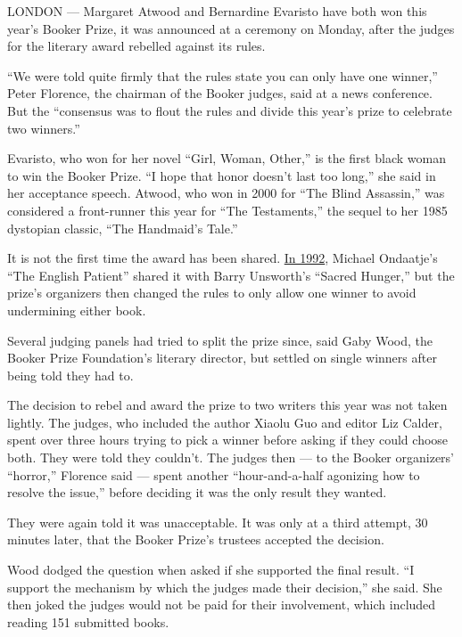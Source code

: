 LONDON --- Margaret Atwood and Bernardine Evaristo have both won this
year's Booker Prize, it was announced at a ceremony on Monday, after the
judges for the literary award rebelled against its rules.

``We were told quite firmly that the rules state you can only have one
winner,'' Peter Florence, the chairman of the Booker judges, said at a
news conference. But the ``consensus was to flout the rules and divide
this year's prize to celebrate two winners.''

Evaristo, who won for her novel ``Girl, Woman, Other,'' is the first
black woman to win the Booker Prize. ``I hope that honor doesn't last
too long,'' she said in her acceptance speech. Atwood, who won in 2000
for ``The Blind Assassin,'' was considered a front-runner this year for
``The Testaments,'' the sequel to her 1985 dystopian classic, ``The
Handmaid's Tale.''

It is not the first time the award has been shared.
\href{https://www.nytimes.com/1992/10/14/books/book-notes-a-lost-work-by-joyce-fuels-scholarly-debate.html}{In
1992}, Michael Ondaatje's ``The English Patient'' shared it with Barry
Unsworth's ``Sacred Hunger,'' but the prize's organizers then changed
the rules to only allow one winner to avoid undermining either book.

Several judging panels had tried to split the prize since, said Gaby
Wood, the Booker Prize Foundation's literary director, but settled on
single winners after being told they had to.

The decision to rebel and award the prize to two writers this year was
not taken lightly. The judges, who included the author Xiaolu Guo and
editor Liz Calder, spent over three hours trying to pick a winner before
asking if they could choose both. They were told they couldn't. The
judges then --- to the Booker organizers' ``horror,'' Florence said ---
spent another ``hour-and-a-half agonizing how to resolve the issue,''
before deciding it was the only result they wanted.

They were again told it was unacceptable. It was only at a third
attempt, 30 minutes later, that the Booker Prize's trustees accepted the
decision.

Wood dodged the question when asked if she supported the final result.
``I support the mechanism by which the judges made their decision,'' she
said. She then joked the judges would not be paid for their involvement,
which included reading 151 submitted books.

